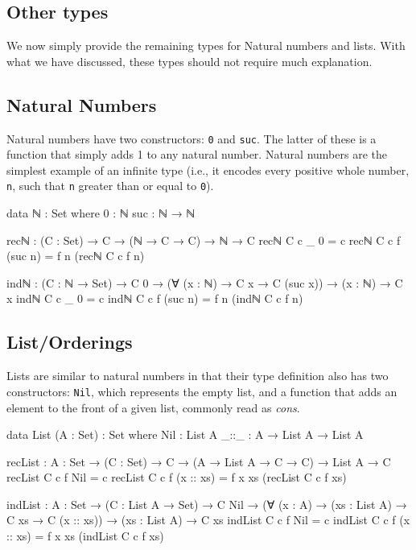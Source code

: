 \documentclass[12pt]{article}
\begin{document}
\subsection*{Other types}
We now simply provide the remaining types for Natural numbers and lists. With
what we have discussed, these types should not require much explanation.

\subsection*{Natural Numbers}
Natural numbers have two constructors: {\tt 0} and {\tt suc}. The latter of
these is a function that simply adds 1 to any natural number. Natural numbers
are the simplest example of an infinite type (i.e., it encodes every positive
whole number, {\tt n}, such that {\tt n} greater than or equal to {\tt 0}).

\begin{center}
\begin{minipage}{0.9\textwidth}
\begin{code}
data ℕ : Set where
  0 : ℕ
  suc : ℕ → ℕ

recℕ : (C : Set) → C → (ℕ → C → C) → ℕ → C
recℕ C c _ 0 = c
recℕ C c f (suc n) = f n (recℕ C c f n) 

indℕ : (C : ℕ → Set) → C 0 →
       (∀ (x : ℕ) → C x → C (suc x)) →
       (x : ℕ) → C x
indℕ C c _ 0 = c
indℕ C c f (suc n) = f n (indℕ C c f n)
\end{code}
\end{minipage}
\end{center}

\subsection*{List/Orderings}
Lists are similar to natural numbers in that their type definition also has two
constructors: {\tt Nil}, which represents the empty list, and a function that
adds an element to the front of a given list, commonly read as {\em cons}.

\begin{center}
\begin{minipage}{0.9\textwidth}
\begin{code}
data List (A : Set) : Set where
  Nil  : List A
  _::_ : A → List A → List A

recList : {A : Set} → (C : Set) → C →
          (A → List A → C → C) → List A → C
recList C c f Nil = c
recList C c f (x :: xs) = f x xs (recList C c f xs)

indList : {A : Set} → (C : List A → Set) → C Nil →
          (∀ (x : A) → (xs : List A) → C xs → C (x :: xs)) →
          (xs : List A) → C xs
indList C c f Nil = c
indList C c f (x :: xs) = f x xs (indList C c f xs)
\end{code}
\end{minipage}
\end{center}
\end{document}
